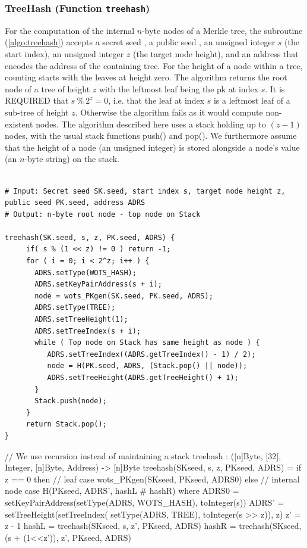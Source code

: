 \subsubsection{TreeHash (Function \texttt{treehash})}
   For the computation of the internal $n$-byte nodes of a Merkle tree,
   the subroutine \treehash (\autoref{algo:treehash}) accepts a secret seed \sseed,
   a public seed \pseed, an unsigned integer $s$ (the start index), an
   unsigned integer $z$ (the target node height), and an address \adrs that
   encodes the address of the containing tree. For the height of a node
   within a tree, counting starts with the leaves at height zero.  The
   \treehash algorithm returns the root node of a tree of height $z$ with
   the leftmost leaf being the \wotsp pk at index $s$. It is
   REQUIRED that $s\ \%\ 2^z = 0$, i.e. that the leaf at index $s$ is a
   leftmost leaf of a sub-tree of height $z$.  Otherwise the algorithm fails
   as it would compute non-existent nodes.  
   The \treehash algorithm described here uses
   a stack holding up to $(z - 1)$ nodes, with the usual stack functions
   push() and pop().  We furthermore assume that the height of a node
   (an unsigned integer) is stored alongside a node's value (an $n$-byte
   string) on the stack.

   
   \begin{lstlisting}[breaklines=true, label=algo:treehash, language=pseudoc,
                   caption=\texttt{treehash} -- The TreeHash algorithm.]

# Input: Secret seed SK.seed, start index s, target node height z, public seed PK.seed, address ADRS
# Output: n-byte root node - top node on Stack

treehash(SK.seed, s, z, PK.seed, ADRS) {
     if( s % (1 << z) != 0 ) return -1;
     for ( i = 0; i < 2^z; i++ ) {
       ADRS.setType(WOTS_HASH);
       ADRS.setKeyPairAddress(s + i);
       node = wots_PKgen(SK.seed, PK.seed, ADRS);
       ADRS.setType(TREE);
       ADRS.setTreeHeight(1);
       ADRS.setTreeIndex(s + i);
       while ( Top node on Stack has same height as node ) {
          ADRS.setTreeIndex((ADRS.getTreeIndex() - 1) / 2);
          node = H(PK.seed, ADRS, (Stack.pop() || node));
          ADRS.setTreeHeight(ADRS.getTreeHeight() + 1);
       }
       Stack.push(node);
     }
     return Stack.pop();
}

\end{lstlisting}

\begin{code}
  // We use recursion instead of maintaining a stack
  treehash : ([n]Byte, [32], Integer, [n]Byte, Address) -> [n]Byte
  treehash(SKseed, s, z, PKseed, ADRS) =
    if z == 0 then
      // leaf case
      wots_PKgen(SKseed, PKseed, ADRS0)
    else
      // internal node case
      H(PKseed, ADRS', hashL # hashR)
    where
      ADRS0 = setKeyPairAddress(setType(ADRS, WOTS_HASH), toInteger(s))
      ADRS' = setTreeHeight(setTreeIndex(
          setType(ADRS, TREE), toInteger(s >> z)), z)
      z' = z - 1
      hashL = treehash(SKseed, s, z', PKseed, ADRS)
      hashR = treehash(SKseed, (s + (1<<z')), z', PKseed, ADRS)
\end{code}

